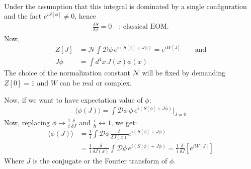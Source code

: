\documentclass[14pt]{article} %
\begin{document}
{\begin{align*}
\end{align*}
Under the assumption that this integral is dominated by a single configuration and the fact $e^{iS[\phi]} \neq 0$, hence
\begin{align*}
    \frac{\delta S}{\delta \phi} = 0 \quad \text{: classical EOM.}
\end{align*}
Now,
\begin{align*}
    Z[J] &= \mathcal{N} \int \mathcal{D}\phi \, e^{i(S[\phi] + J \phi)} = e^{iW[J]} \qquad \text{and} \\
    J \phi &= \int d^4x \, J(x) \phi(x)
\end{align*}
The choice of the normalization constant $\mathcal{N}$ will be fixed by demanding $Z[0] = 1$ and $W$ can be real or complex.

Now, if we want to have expectation value of $\phi$:
\begin{align*}
    \langle \phi(J) \rangle = \int \mathcal{D}\phi \, \phi \, e^{i(S[\phi] + J \phi)}\Big|_{J=0}
\end{align*}
Now, replacing $\phi \to \frac{1}{i} \frac{\delta}{\delta J}$ and $\frac{i}{\hbar} \longleftrightarrow 1$, we get:
\begin{align*}
\langle \phi(J) \rangle &=  \frac{1}{i}  \int \mathcal{D}\phi \,\frac{\delta}{\delta J(x)} e^{i(S[\phi] + J \phi)} \\
&=\frac{1}{i} \frac{\delta}{\delta J(x)} \int \mathcal{D}\phi \, e^{i(S[\phi] + J \phi)} = \frac{1}{i} \frac{\delta}{\delta J} \left[ e^{iW[J]} \right]
\end{align*}
Where $J$ is the conjugate or the Fourier transform of $\phi$.

}
\end{document}
